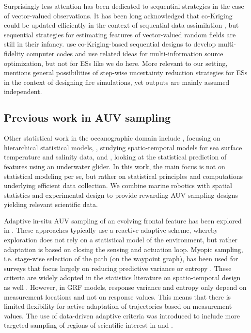 \documentclass[aoas]{imsart}
\begin{document}
Surprisingly less attention has been dedicated to sequential
strategies in the case of vector-valued observations. It has been long
acknowledged that co-Kriging could be updated efficiently in the
context of sequential data assimilation \citep{Vargas-Guzman1999}, but
sequential strategies for estimating features of vector-valued random
fields are still in their infancy. \cite{LeGratiet.etal2015} use
co-Kriging-based sequential designs to develop multi-fidelity computer codes
and \cite{Poloczek2017} use related ideas for multi-information
source optimization, but not for ESs like we do here. More relevant
to our setting, \citet[p.82]{stroh} mentions general possibilities of
step-wise uncertainty reduction strategies for ESs in the context of
designing fire simulations, yet outputs are mainly assumed
independent.

\subsection{Previous work in AUV sampling}

Other statistical work in the oceanographic domain include
\cite{wikle2013modern}, focusing on hierarchical statistical models,
\cite{sahu2008space}, studying spatio-temporal models for sea surface
temperature and salinity data, and \cite{mellucci2018oceanic}, looking
at the statistical prediction of features using an underwater glider.
In this work, the main focus is not on statistical modeling per se, but
rather on statistical principles and computations underlying efficient
data collection. We combine marine robotics
with spatial statistics and experimental design to provide rewarding AUV
sampling designs yielding relevant scientific data.

Adaptive in-situ AUV sampling of an evolving frontal feature has been
explored in \cite{fronts11,Smith2016,Pinto2018,costa19}. These
approaches typically use a reactive-adaptive scheme, whereby
exploration does not rely on a statistical model of the environment,
but rather adaptation is based on closing the sensing and actuation
loop. Myopic sampling, i.e. stage-wise selection of the path (on the
waypoint graph), has been used for surveys
 that focus largely on reducing
predictive variance or entropy \citep{singh2009efficient,Binney2013}. These criteria are widely adopted in
the statistics literature on spatio-temporal design as well
\citep{bueso1998state,zidek2019monitoring}. However, in GRF models, response variance and entropy only depend on measurement locations and not on response values. This means that there is limited flexibility for
active adaptation of trajectories based on measurement values. The use
of data-driven adaptive criteria was introduced to include more
targeted sampling of regions of scientific interest in \cite{Low2009}
and \cite{fossuminformation}.
\end{document}
